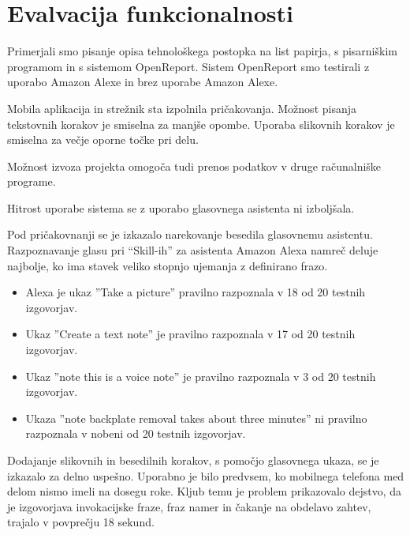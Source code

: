 \documentclass[a4paper, 12pt]{book}
\begin{document}



\section{Evalvacija funkcionalnosti}


Primerjali smo pisanje opisa tehnološkega postopka na list papirja, s pisarniškim programom in s sistemom OpenReport.
Sistem OpenReport smo testirali z uporabo Amazon Alexe in brez uporabe Amazon Alexe.

Mobila aplikacija in strežnik sta izpolnila pričakovanja.
Možnost pisanja tekstovnih korakov je smiselna za manjše opombe.
Uporaba slikovnih korakov je smiselna za večje oporne točke pri delu.

Možnost izvoza projekta omogoča tudi prenos podatkov v druge računalniške programe.

Hitrost uporabe sistema se z uporabo glasovnega asistenta ni izboljšala.

Pod pričakovnanji se je izkazalo narekovanje besedila glasovnemu asistentu.
Razpoznavanje glasu pri \enquote{Skill-ih} za asistenta Amazon Alexa namreč deluje najbolje, ko ima stavek veliko stopnjo ujemanja z definirano frazo.
\begin{itemize}
	\item Alexa je ukaz ''Take a picture'' pravilno razpoznala v 18 od 20 testnih izgovorjav.
	\item Ukaz ''Create a text note'' je pravilno razpoznala v 17 od 20 testnih izgovorjav.
	\item Ukaz ''note this is a voice note'' je pravilno razpoznala v 3 od 20 testnih izgovorjav.
	\item Ukaza ''note backplate removal takes about three minutes'' ni pravilno razpoznala v nobeni od 20 testnih izgovorjav.
\end{itemize}

Dodajanje slikovnih in besedilnih korakov, s pomočjo glasovnega ukaza, se je izkazalo za delno uspešno.
Uporabno je bilo predvsem, ko mobilnega telefona med delom nismo imeli na dosegu roke.
Kljub temu je problem prikazovalo dejstvo, da je izgovorjava invokacijske fraze, fraz namer in čakanje na obdelavo zahtev, trajalo v povprečju 18 sekund.
\end{document}
